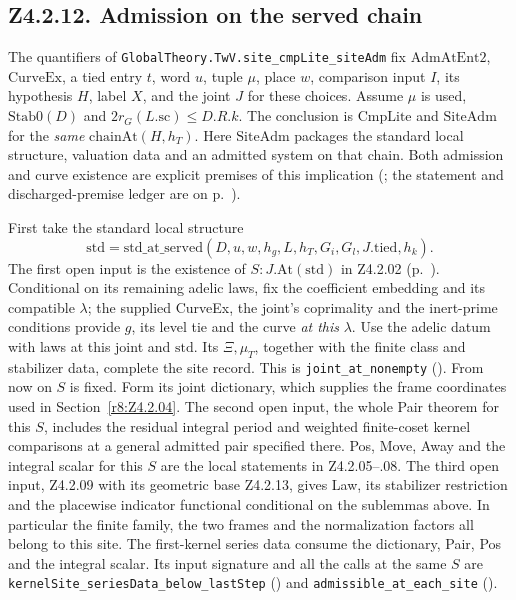 \subsection{Z4.2.12. Admission on the served chain}\label{r8:Z4.2.12}
The quantifiers of \nolinkurl{GlobalTheory.TwV.site_cmpLite_siteAdm} fix
\(\mathrm{AdmAtEnt2}\), \(\mathrm{CurveEx}\), a tied entry \(t\), word \(u\),
tuple \(\mu\), place \(w\), comparison input \(I\), its hypothesis \(H\),
label \(X\), and the joint \(J\) for these choices. Assume \(\mu\) is used,
\(\mathrm{Stab0}(D)\) and \(2r_G(L.\mathrm{sc})\le D.R.k\). The conclusion is
\(\mathrm{CmpLite}\) and \(\mathrm{SiteAdm}\) for the \emph{same}
\(\mathrm{chainAt}(H,h_T)\). Here \(\mathrm{SiteAdm}\) packages the
standard local structure, valuation data and an admitted system on that
chain. Both admission and curve existence are explicit premises of this implication
(;
the statement and discharged-premise ledger are on p.~\pageref{r6:Z4.2.12}).

First take the standard local structure
\[\mathrm{std}=\mathrm{std\_at\_served}(D,u,w,h_g,L,h_T,G_i,G_l,J.\mathrm{tied},h_k).\]
The first open input is the existence of \(S:J.\mathrm{At}(\mathrm{std})\)
in Z4.2.02 (p.~\pageref{r8:Z4.2.02}). Conditional on its remaining
adelic laws, fix the coefficient embedding and its compatible \(\lambda\);
the supplied CurveEx, the joint's coprimality and the inert-prime
conditions provide \(g\), its level tie and the curve \emph{at this}
\(\lambda\). Use the adelic datum with laws at this joint and
\(\mathrm{std}\). Its \(\Xi,\mu_T\), together with the finite class and
stabilizer data, complete the site record. This is
\nolinkurl{joint_at_nonempty}
().
From now on \(S\) is fixed. Form its joint dictionary, which supplies the
frame coordinates used in Section~\ref{r8:Z4.2.04}. The second open
input, the whole Pair theorem for this \(S\), includes the residual
integral period and weighted finite-coset kernel comparisons at a general
admitted pair specified there. Pos, Move,
Away and the integral scalar for this \(S\) are the local statements
in Z4.2.05--.08. The third open input, Z4.2.09 with its geometric base
Z4.2.13, gives Law, its stabilizer restriction and the placewise
indicator functional conditional on the sublemmas above. In particular the finite family, the
two frames and the normalization factors all belong to this site.
The first-kernel series data consume the dictionary, Pair, Pos and the
integral scalar. Its input signature and all the calls at the same
\(S\) are \nolinkurl{kernelSite_seriesData_below_lastStep}
()
and \nolinkurl{admissible_at_each_site}
().

